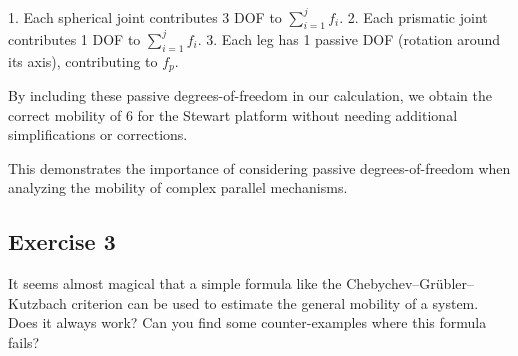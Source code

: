 \begin{solution}
    1. Each spherical joint contributes 3 DOF to $\sum_{i=1}^j f_i$.
    2. Each prismatic joint contributes 1 DOF to $\sum_{i=1}^j f_i$.
    3. Each leg has 1 passive DOF (rotation around its axis), contributing to $f_p$.

    By including these passive degrees-of-freedom in our calculation, we obtain the correct mobility of 6 for the Stewart platform without needing additional simplifications or corrections.

    This demonstrates the importance of considering passive degrees-of-freedom when analyzing the mobility of complex parallel mechanisms.
\end{solution}


\subsection{Exercise 3}

It seems almost magical that a simple formula like the Chebychev–Grübler–Kutzbach criterion can be used to estimate the general mobility of a system. Does it always work? Can you find some counter-examples where this formula fails?

